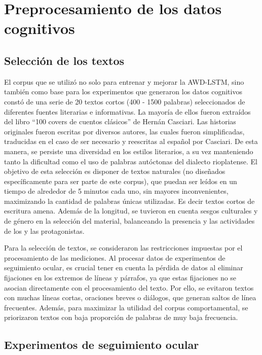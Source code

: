 \chapter{Preprocesamiento de los datos cognitivos}

\label{chap:preprocesamiento}

\section{Selección de los textos}

El corpus que se utilizó no solo para entrenar y mejorar la AWD-LSTM, sino también como base para los experimentos que generaron los datos cognitivos constó de una serie de 20 textos cortos (400 - 1500 palabras) seleccionados de diferentes fuentes literarias e informativas. La mayoría de ellos fueron extraídos del libro “100 covers de cuentos clásicos” de Hernán Casciari. Las historias originales fueron escritas por diversos autores, las cuales fueron simplificadas, traducidas en el caso de ser necesario y reescritas al español por Casciari. De esta manera, se persiste una diversidad en los estilos literarios, a su vez manteniendo tanto la dificultad como el uso de palabras autóctonas del dialecto rioplatense. El objetivo de esta selección es disponer de textos naturales (no diseñados específicamente para ser parte de este corpus), que puedan ser leídos en un tiempo de alrededor de 5 minutos cada uno, sin mayores inconvenientes, maximizando la cantidad de palabras únicas utilizadas. Es decir textos cortos de escritura amena. Además de la longitud, se tuvieron en cuenta sesgos culturales y de género en la selección del material, balanceando la presencia y las actividades de los y las protagonistas.

Para la selección de textos, se consideraron las restricciones impuestas por el procesamiento de las mediciones. Al procesar datos de experimentos de seguimiento ocular, es crucial tener en cuenta la pérdida de datos al eliminar fijaciones en los extremos de líneas y párrafos, ya que estas fijaciones no se asocian directamente con el procesamiento del texto. \parencite{Rayner1998} Por ello, se evitaron textos con muchas líneas cortas, oraciones breves o diálogos, que generan saltos de línea frecuentes. Además, para maximizar la utilidad del corpus comportamental, se priorizaron textos con baja proporción de palabras de muy baja frecuencia. \parencite{Inhoff1984}

\section{Experimentos de seguimiento ocular}


